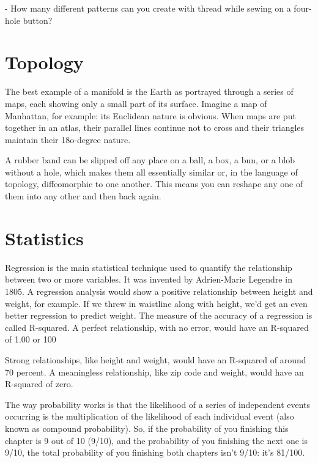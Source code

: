 - How many different   patterns can you create with thread while sewing on a four-hole   button?

\chapter{Topology}
The best example of a manifold is the Earth as portrayed   through a series of maps, each showing only a small part of  its surface. Imagine a map of Manhattan, for example: its Euclidean   nature is obvious. When maps are put together in an atlas,  their parallel lines continue not to cross and their triangles maintain   their 18o-degree nature.

A rubber band can be slipped off any place on a ball, a box, a bun,  or a blob without a hole, which makes them all essentially similar  or, in the language of topology, diffeomorphic to one another. This  means you can reshape any one of them into any other and then  back again.

\chapter{Statistics}
Regression is the main statistical technique used to quantify the relationship between two or more variables. It was invented by
Adrien-Marie Legendre in 1805. A regression analysis would show a positive relationship between height and weight, for example.
If we threw in waistline along with height, we’d get an even better regression to predict weight. The measure of the accuracy of a
regression is called R-squared. A perfect relationship, with no error, would have an R-squared of 1.00 or 100

Strong relationships, like height and weight, would have an R-squared of around 70 percent. A meaningless relationship, like zip
code and weight, would have an R-squared of zero.

The way probability works is that the likelihood of a series of independent events occurring is the multiplication of the
likelihood of each individual event (also known as compound probability). So, if the probability of you finishing this chapter is
9 out of 10 (9/10), and the probability of you finishing the next one is 9/10, the total probability of you finishing both
chapters isn't 9/10: it's 81/100.

